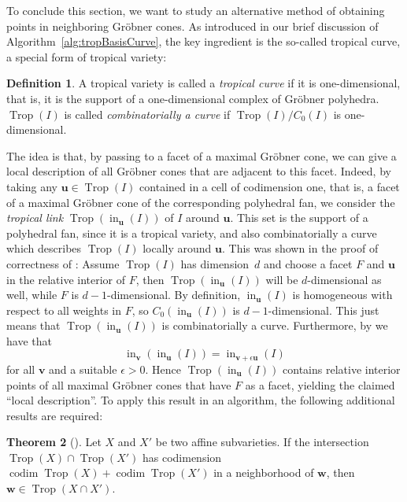 \documentclass[
  paper=a4,
  titlepage,
  bibliography=totoc,
  pagesize=pdftex
]{scrartcl}
\numberwithin{figure}{section}
\numberwithin{equation}{section}
\numberwithin{table}{section}
\let\vec\mathbf
\DeclareMathOperator{\Trop}{Trop}
\DeclareMathOperator{\initial}{in}
\DeclareMathOperator{\codim}{codim}
\theoremstyle{definition}
\newtheorem{definition}{Definition}
\newtheorem{theorem}[definition]{Theorem}
\numberwithin{definition}{section}
\begin{document}
To conclude this section, we want to study an alternative method of obtaining points in
neighboring Gröbner cones. As introduced in our brief discussion of
Algorithm~\ref{alg:tropBasisCurve}, the key ingredient is the so-called tropical
curve, a special form of tropical variety:

\begin{definition}
  A tropical variety is called a \emph{tropical curve} if it is one-dimensional, that is,
  it is the support of a one-dimensional complex of Gröbner polyhedra. $\Trop(I)$ is
  called \emph{combinatorially a curve} if $\Trop(I)/C_0(I)$ is one-dimensional.
\end{definition}

The idea is that, by passing to a facet of a maximal Gröbner cone, we can give a local
description of all Gröbner cones that are adjacent to this facet. Indeed, by taking any
$\vec u \in \Trop(I)$ contained in a cell of codimension one, that is, a facet of a
maximal Gröbner cone of the corresponding polyhedral fan, we consider the \emph{tropical
link} $\Trop(\initial_{\vec u}(I))$ of $I$ around $\vec u$. This set is the support of a
polyhedral fan, since it is a tropical variety, and also combinatorially a curve which
describes $\Trop(I)$ locally around $\vec u$. This was shown in the proof of correctness
of \cite[Algorithm~4.10]{compTropVar}: Assume $\Trop(I)$ has dimension~$d$ and choose a
facet $F$ and $\vec u$ in the relative interior of $F$, then $\Trop(\initial_{\vec u}(I))$
will be $d$-dimensional as well, while $F$ is $d-1$-dimensional. By definition,
$\initial_{\vec u}(I)$ is homogeneous with respect to all weights in $F$, so
$C_0(\initial_{\vec u}(I))$ is $d-1$-dimensional. This just means that
$\Trop(\initial_{\vec u}(I))$ is combinatorially a curve. Furthermore, by
\cite[Proposition~1.13]{SturmGBCP} we have that
\[
  \initial_{\vec v}(\initial_{\vec u}(I)) = \initial_{\vec v + \epsilon \vec u}(I)
\]
for all $\vec v$ and a suitable $\epsilon>0$. Hence $\Trop(\initial_{\vec u}(I))$ contains
relative interior points of all maximal Gröbner cones that have $F$ as a facet, yielding
the claimed \enquote{local description}. To apply this result in an algorithm, the
following additional results are required:

\begin{theorem}[{\cite[Theorem~1.1]{ossTropLift}}]
  \label{thm:tropInt}
  Let $X$ and $X'$ be two affine subvarieties. If the intersection $\Trop(X) \cap
  \Trop(X')$ has codimension $\codim\Trop(X) + \codim\Trop(X')$ in a neighborhood of $\vec
  w$, then $\vec w \in \Trop(X\cap X')$.
\end{theorem}
\end{document}
